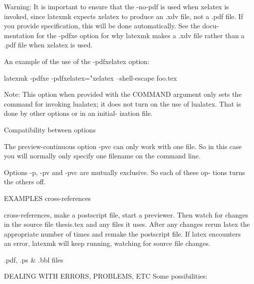               Warning: It is important to ensure that the -no-pdf is used when
              xelatex  is invoked, since latexmk expects xelatex to produce an
              .xdv file, not a .pdf file. If you provide  %
              specification,  this  will be done automatically.  See the docu-
              mentation for the -pdfxe option for why  latexmk  makes  a  .xdv
              file rather than a .pdf file when xelatex is used.

              An example of the use of the -pdfxelatex option:

                   latexmk  -pdfxe  -pdfxelatex="xelatex --shell-escape %
              foo.tex

              Note: This option when provided with the COMMAND  argument  only
              sets  the command for invoking lualatex; it does not turn on the
              use of lualatex. That is done by other options or in an initial-
              ization file.


       Compatibility between options

       The  preview-continuous option -pvc can only work with one file.  So in
       this case you will normally only specify one filename  on  the  command
       line.

       Options  -p, -pv and -pvc are mutually exclusive.  So each of these op-
       tions turns the others off.


EXAMPLES
                           cross-references

                           cross-references, make a postscript
                           file, start a previewer.  Then
                           watch for changes in the source
                           file thesis.tex and any files it
                           uses.  After any changes rerun latex
                           the appropriate number of times and
                           remake the postscript file.  If latex
                           encounters an error, latexmk will
                           keep running, watching for
                           source file changes.

                           .pdf, .ps & .bbl files



DEALING WITH ERRORS, PROBLEMS, ETC
       Some possibilities:

